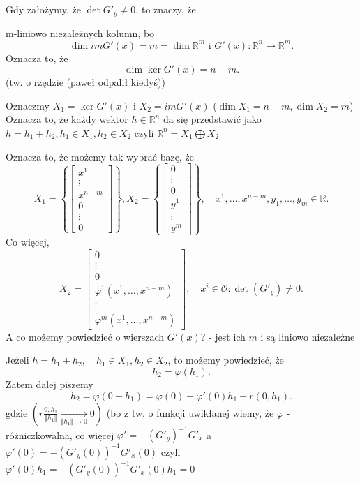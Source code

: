 \documentclass[../main.tex]{subfiles}
\begin{document}
    Gdy założymy, że $\det G'_y \neq 0$, to znaczy, że

    m-liniowo niezależnych kolumn, bo
    \[
        \dim im G'(x) = m = \dim \mathbb{R}^m \text{ i } G'(x): \mathbb{R}^n\to\mathbb{R}^m
    .\] Oznacza to, że \[
    \dim \ker G'(x) = n-m
.\] (tw. o rzędzie (paweł odpalił kiedyś))

Oznaczmy $X_1 = \ker G'(x)$ i $X_2 = im G'(x)$ ($\dim X_1 = n-m, \dim X_2 = m$)
Oznacza to, że każdy wektor $h\in \mathbb{R}^n$ da się przedstawić jako $h = h_1 + h_2, h_1\in X_1, h_2\in X_2$ czyli $\mathbb{R}^{n} = X_1 \bigoplus X_2$

Oznacza to, że możemy tak wybrać bazę, że \[
    X_1 = \left\{ \begin{bmatrix}
    x^1\\
    \vdots\\
    x^{n-m}\\
    0\\
    \vdots\\
    0\end{bmatrix}  \right\}
    , X_2 = \left\{ \begin{bmatrix} 0\\
    \vdots\\
    0\\
    y^1\\
    \vdots\\
    y^m
    \end{bmatrix}  \right\},\quad x^1,\ldots,x^{n-m},y_1,\ldots,y_m \in \mathbb{R}
.\]
Co więcej, \[
X_2 = \begin{bmatrix}
0\\
\vdots\\
0\\
\varphi^1(x^1,\ldots,x^{n-m})\\
\vdots\\
\varphi^m(x^1,\ldots,x^{n-m})
\end{bmatrix}, \quad x^i \in \mathcal{O} : \det (G'_y) \neq 0
.\]
A co możemy powiedzieć o wierszach
$G'(x)$? - jest ich $m$ i są liniowo niezależne

Jeżeli $h = h_1 + h_2,\quad h_1\in X_1, h_2\in X_2$, to możemy powiedzieć, że
\[
h_2 = \varphi(h_1)
.\]
Zatem dalej piszemy
\[
    h_2 = \varphi(0 + h_1) = \varphi(0) + \varphi'(0)h_1 + r(0,h_1)
.\]
gdzie $(r\frac{0,h_1}{\Vert h_1 \Vert} \underset{\Vert h_1 \Vert \to 0}{\rightarrow} 0)$ (bo z tw. o funkcji uwikłanej wiemy, że $\varphi$ - różniczkowalna, co więcej $\varphi' = -(G'_y)^{-1} G'_x$ a $\varphi'(0) = -(G'_y(0))^{-1} G'_x(0)$ czyli $\varphi'(0) h_1 = -(G'_y(0))^{-1} G'_x(0)h_1 = 0$
\end{document}
